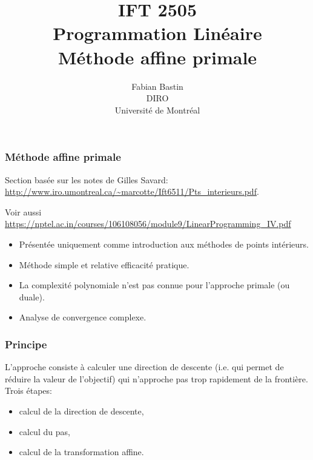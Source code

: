 \documentclass[usepdftitle=false]{beamer}
\title[IFT2505]{IFT 2505\\Programmation Linéaire\\Méthode affine primale}
\author[Fabian Bastin]{Fabian Bastin\\DIRO\\Université de Montréal\\\mbox{}}
\date{}
\begin{document}
\frame{\titlepage}


\begin{frame}
\frametitle{Méthode affine primale}

Section basée sur les notes de Gilles Savard: \url{http://www.iro.umontreal.ca/~marcotte/Ift6511/Pts_interieurs.pdf}.

Voir aussi \url{https://nptel.ac.in/courses/106108056/module9/LinearProgramming_IV.pdf}

\begin{itemize}
\item 
Présentée uniquement comme introduction aux méthodes de points intérieurs.
\item
Méthode simple et relative efficacité pratique.
\item
La complexité polynomiale n’est pas connue pour l'approche primale (ou duale).
\item
Analyse de convergence complexe.
\end{itemize}

\end{frame}

\begin{frame}
\frametitle{Principe}

L'approche consiste à calculer une direction de descente (i.e. qui permet de réduire la valeur de l'objectif) qui n’approche pas trop rapidement
de la frontière.
Trois étapes:
\begin{itemize}
\item 
calcul de la direction de descente,
\item
calcul du pas,
\item
calcul de la transformation affine.
\end{itemize}
\end{frame}
\end{document}
